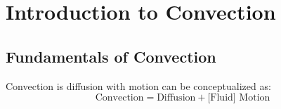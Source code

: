     
    
\section*{Introduction to Convection}
\subsection*{Fundamentals of Convection}
Convection is diffusion with motion can be conceptualized as:
\[
    \text{Convection} = \text{Diffusion} + \text{[Fluid] Motion}
\]

